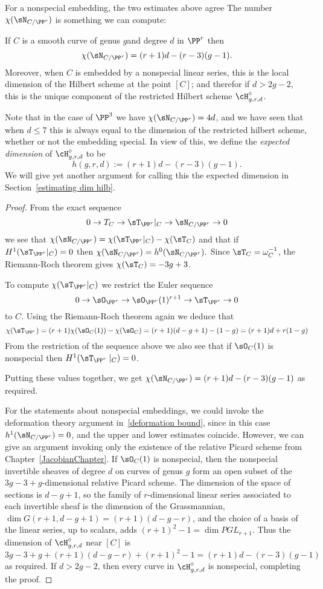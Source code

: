 For a nonspecial embedding, the two estimates above agree
The number $\chi(\sN_{C/\PP^r})$ is something we can compute:

\begin{theorem}\label{nonspecial Hilbert}
 If $C$ is a smooth curve of genus $g$and degree $d$ in $\PP^r$ then
 $$
 \chi(\sN_{C/\PP^r}) = (r+1)d - (r-3)(g-1).
 $$
 Moreover, when $C$ is embedded by a nonspecial linear series, this is the local dimension
 of the Hilbert scheme at the point $[C]$; and therefor if $d>2g-2$,
 this is the unique component of the restricted Hilbert scheme $\cH^\circ_{g,r,d}$.
\end{theorem}

Note that in the case of $\PP^3$ we have $\chi(\sN_{C/\PP^r}) = 4d$, and we have
seen that when $d\leq 7$ this is always equal to the dimension of the restricted hilbert
scheme, whether or not the embedding special. In view of this,
we define the \emph{expected dimension} of $\cH^\circ_{g,r,d}$ to be
$$
h(g,r,d) := (r+1)d - (r-3)(g-1).
$$
We will give yet another argument for calling this the expected dimension in Section~\ref{estimating dim hilb}.

\begin{proof} 
 From the exact sequence
$$
0 \to T_C \to \sT_{\PP^r}|_C \to \sN_{C/\PP^r} \to 0
$$
we see that $\chi(\sN_{C/\PP^r}) = \chi(\sT_{\PP^r}|_C) - \chi(\sT_C)$
and that if $H^1( \sT_{\PP^r}|_C) = 0$ then $\chi(\sN_{C/\PP^r}) = h^0(\sN_{C/\PP^r}).$
Since $\sT_C = \omega_C^{-1}$, the Riemann-Roch theorem gives $\chi(\sT_C) = -3g+3$.

To compute $\chi(\sT_{\PP^r}|_C)$ we restrict the Euler sequence
$$
0\to \sO_{\PP^r} \to \sO_{\PP^r}(1)^{r+1} \to \sT_{\PP^r} \to 0
$$
to $C$.
Using the Riemann-Roch theorem again we deduce that
$$
\chi( \sT_{\PP^r} ) = (r+1)\chi(\sO_C(1)) - \chi(\sO_C) = (r+1)(d-g+1) - (1-g) = (r+1)d + r(1-g)
$$
From the restriction of the sequence above we also see that
if $\sO_C(1)$ is nonspecial then $H^1(\sT_{\PP^r}\mid_C) = 0$.

Putting these values together, we get
$
\chi(\sN_{C/\PP^r}) = (r+1)d - (r-3)(g-1)
$
as required.

For the statements about  nonspecial embeddings, we could invoke the deformation theory argument
in~\ref{deformation bound}, since in this case $h^1(\sN_{C/\PP^r}) = 0$, and the upper and lower estimates
coincide. However, we can give an argument invoking only the existence of the relative Picard scheme from
Chapter~\ref{JacobianChapter}.
If $\sO_C(1)$ is nonspecial, then the
nonspecial invertible sheaves of degree $d$ on curves of genus $g$
 form an open subset of the $3g-3+ g$-dimensional relative Picard scheme. The dimension
 of the space of sections is $d-g+1$, so the family of $r$-dimensional linear series associated to
 each invertible sheaf is the dimension of the Grassmannian, $\dim G(r+1, d-g+1) = (r+1)(d-g-r)$,
 and the choice of a basis of the linear series, up to scalars, adds $(r+1)^2-1 = \dim PGL_{r+1}$. 
 Thus the dimension of  $\cH^\circ_{g,r,d}$ near $[C]$ is
$$
3g-3+ g + (r+1)(d-g-r) + (r+1)^2-1 = (r+1)d - (r-3)(g-1)
$$
as required. If $d>2g-2$, then every curve in $\cH^\circ_{g,r,d}$ is nonspecial, completing the proof.
\end{proof}

